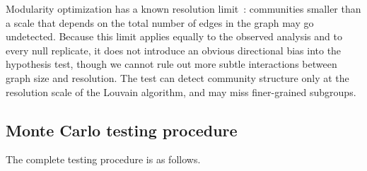 \documentclass[hidelinks]{siamart251216}
\begin{document}
Modularity optimization has a known resolution
limit~\citep{Fortunato2007}: communities smaller than a scale that
depends on the total number of edges in the graph may go undetected.
Because this limit applies equally to the observed analysis and to
every null replicate, it does not introduce an obvious directional bias
into the hypothesis test, though we cannot rule out more subtle
interactions between graph size and resolution.  The test can detect
community structure only at the resolution scale of the Louvain
algorithm, and may miss finer-grained subgroups.


\subsection{Monte Carlo testing procedure}\label{sec:mc-procedure}

The complete testing procedure is as follows.
\end{document}
